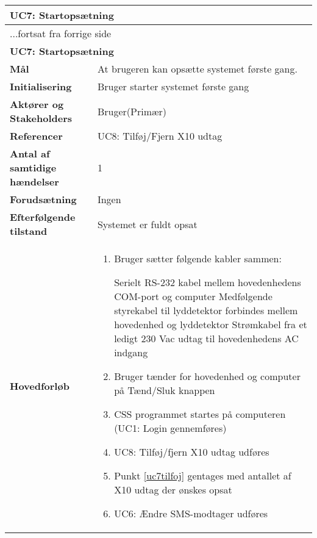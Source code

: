 \begin{center} \centering
	\begin{longtable}{|p{6cm}|p{8cm}|}
	\hline
		\multicolumn{2}{|l|}{\textbf{UC7: Startopsætning}} \\\hline
		\endfirsthead
		
		\multicolumn{2}{l}{...fortsat fra forrige side} \\ \hline 
		\multicolumn{2}{|l|}{\textbf{UC7: Startopsætning}} \\\hline
		\endhead	
		
		\textbf{Mål}							&At brugeren kan opsætte systemet første gang.					\\\hline
		\textbf{Initialisering}				&Bruger	starter systemet første gang				 										\\\hline
		\textbf{Aktører og Stakeholders}		&Bruger(Primær)			\\\hline
		\textbf{Referencer}					&UC8: Tilføj/Fjern X10 udtag										\\\hline
		\textbf{Antal af samtidige hændelser}&1 																\\\hline
		\textbf{Forudsætning}				&Ingen															\\\hline
		\textbf{Efterfølgende tilstand}		&Systemet er fuldt opsat											\\\hline
		\textbf{Hovedforløb}					
			&\begin{enumerate}
	
				\item Bruger sætter følgende kabler sammen:
				
					\subitem Serielt RS-232 kabel mellem hovedenhedens COM-port og computer
					\subitem Medfølgende styrekabel til lyddetektor forbindes mellem hovedenhed og lyddetektor
					\subitem Strømkabel fra et ledigt 230 Vac udtag til hovedenhedens AC indgang
				
				\item Bruger tænder for hovedenhed og computer på Tænd/Sluk knappen
				
				\item CSS programmet startes på computeren (UC1: Login gennemføres)
				
				\item \label{uc7tilfoj} UC8: Tilføj/fjern X10 udtag udføres
				
				\item Punkt \ref{uc7tilfoj} gentages med antallet af X10 udtag der ønskes opsat
				
				\item \label{uc7sms} UC6: Ændre SMS-modtager udføres
																													
			\end{enumerate}\\\hline
											
	\end{longtable}
	\label{UC7} 
\end{center}